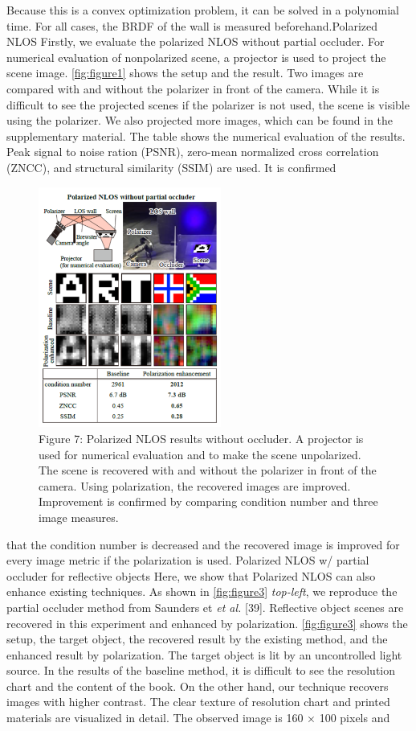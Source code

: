 \documentclass[10pt,twocolumn,letterpaper]{article}
\begin{document}
Because this is a convex optimization problem, it can be
solved in a polynomial time. For all cases, the BRDF of the
wall is measured beforehand.Polarized NLOS Firstly, we evaluate the polarized NLOS
without partial occluder. For numerical evaluation of nonpolarized
scene, a projector is used to project the scene image.
\cref{fig:figure1} shows the setup and the result. Two images
are compared with and without the polarizer in front of the
camera. While it is difficult to see the projected scenes if
the polarizer is not used, the scene is visible using the polarizer.
We also projected more images, which can be found
in the supplementary material. The table shows the numerical
evaluation of the results. Peak signal to noise ration
(PSNR), zero-mean normalized cross correlation (ZNCC),
and structural similarity (SSIM) are used. It is confirmed

\begin{figure}[H]
    \centering
    \includegraphics[width=6cm]{image/image4.PNG}
    \caption{Figure 7: Polarized NLOS results without occluder. A
projector is used for numerical evaluation and to make the
scene unpolarized. The scene is recovered with and without
the polarizer in front of the camera. Using polarization, the
recovered images are improved. Improvement is confirmed
by comparing condition number and three image measures.}
    \label{fig:figure2}
\end{figure}


that the condition number is decreased and the recovered
image is improved for every image metric if the polarization
is used.
Polarized NLOS w/ partial occluder for reflective objects
Here, we show that Polarized NLOS can also enhance
existing techniques. As shown in \cref{fig:figure3} \textit{top-left},
we reproduce the partial occluder method from Saunders et
\textit{et al.} [39]. Reflective object scenes are recovered in this experiment
and enhanced by polarization. \cref{fig:figure3} shows the
setup, the target object, the recovered result by the existing
method, and the enhanced result by polarization. The target
object is lit by an uncontrolled light source. In the results
of the baseline method, it is difficult to see the resolution
chart and the content of the book. On the other hand, our
technique recovers images with higher contrast. The clear
texture of resolution chart and printed materials are visualized
in detail. The observed image is 160 × 100 pixels and
\end{document}

